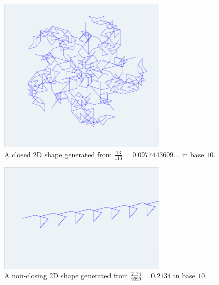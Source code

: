 \documentclass[11pt,titlepage]{article}
\begin{document}
\begin{figure}[h!]
  \centering
  \includegraphics[width=8cm]{fig/Turtle1D13Div113.png}
  \caption{A closed 2D shape generated from $\frac{13}{113} = 0.0977443609...$ in base $10$.}
\end{figure}
\begin{figure}[h!]
  \centering
  \includegraphics[width=8cm]{fig/Turtle1DNotClosed.png}
  \caption{A non-closing 2D shape generated from $\frac{2134}{9999} = 0.\overline{2134}$ in base $10$.}
\end{figure}
\end{document}
